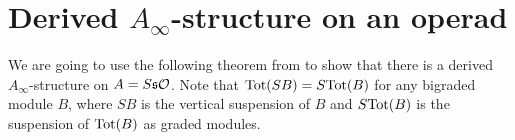 \documentclass[twoside]{article}
\begin{document}
%
%
%
%
%
%



\section{Derived $A_\infty$-structure on an operad}\label{derivedstructure}


We are going to use the following theorem from \cite{whitehouse} to show that there is a derived $A_\infty$-structure on $A=S\mathfrak{s}{\mathcal O}$. Note that $\mathrm{Tot}(SB)=S\mathrm{Tot}(B)$ for any bigraded module $B$, where $SB$ is the vertical suspension of $B$ and $S\mathrm{Tot}(B)$ is the suspension of $\mathrm{Tot}(B)$ as graded modules.
\end{document}

